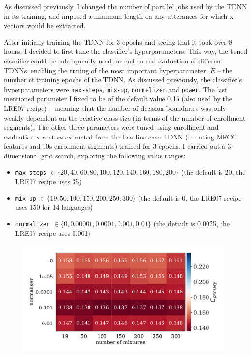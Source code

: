 \documentclass[bsc,frontabs,twoside,singlespacing,parskip,deptreport]{infthesis}
\begin{document}
{{    As discussed previously, I changed the number of parallel jobs used by the TDNN in its training, and imposed a minimum length on any utterances for which x-vectors would be extracted.

    After initially training the TDNN for 3 epochs and seeing that it took over 8 hours, I decided to first tune the classifier's hyperparameters. This way, the tuned classifier could be subsequently used for end-to-end evaluation of different TDNNs, enabling the tuning of the most important hyperparameter: $E$ -- the number of training epochs of the TDNN. As discussed previously, the classifier's hyperparameters were \verb|max-steps|, \verb|mix-up|, \verb|normalizer| and \verb|power|. The last mentioned parameter I fixed to be of the default value 0.15 (also used by the LRE07 recipe) -- meaning that the number of decision boundaries was only weakly dependent on the relative class size (in terms of the number of enrollment segments). The other three parameters were tuned using enrollment and evaluation x-vectors extracted from the baseline-case TDNN (i.e. using MFCC features and 10s enrollment segments) trained for 3 epochs. I carried out a 3-dimensional grid search, exploring the following value ranges: 
    \begin{itemize}
      \item{\verb|max-steps| $ \in \{20, 40, 60, 80, 100, 120, 140, 160, 180, 200\}$ (the default is 20, the LRE07 recipe uses 35)}
      \item{\verb|mix-up| $ \in \{19, 50, 100, 150, 200, 250, 300\}$ (the default is 0, the LRE07 recipe uses 150 for 14 languages)}
      \item{\verb|normalizer| $ \in \{0, 0.00001, 0.0001, 0.001, 0.01\}$ (the default is 0.0025, the LRE07 recipe uses 0.001)}
    \end{itemize}
    \begin{figure}[h!t]
      \centering
      \includegraphics[width=11cm]{../img/normaliser_vs_mix-up_best.pdf}

\end{figure}}}
\end{document}
